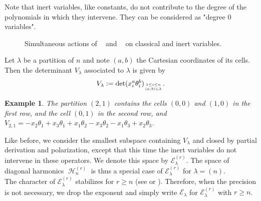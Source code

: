 \documentclass[letter,12pt]{article}
\newcommand{\Elambda}[1]{\mathcal{E}_{#1}}
\newcommand{\Elambdar}[2]{\mathcal{E}_{#1}^{(#2)}}
\DeclareMathOperator{\Sn}{\mathbb{S}_n}
\DeclareMathOperator{\GLr}{GL_r}
\DeclareMathOperator{\harmonics}{\mathcal{H}}
\newtheorem{example}{Example}
\begin{document}
	Note that inert variables, like constants, do not contribute to the degree of the polynomials in which they intervene. They can be considered as "degree 0 variables".  
	
	\begin{figure}[H]
		\centering
		\caption{Simultaneous actions of $\GLr$ and $\Sn$ on classical and inert variables.}
	\end{figure}
	
	Let $\lambda$ be a partition of $n$ and note $(a,b)$ the Cartesian coordinates of its cells. Then the determinant $V_{\lambda}$ associated to $\lambda$ is given by $$V_{\lambda} := \det (x_i^a \theta_i^b)_{1 \leq i \leq n \atop (a,b) \in \lambda} .$$
	
	\begin{example}
		The partition $(2,1)$ contains the cells $(0,0)$ and $(1,0)$ in the first row, and the cell $(0,1)$ in the second row, and $V_{2,1} = -x_2\theta_1 + x_3\theta_1 + x_1\theta_2 - x_3\theta_2 - x_1\theta_3 + x_2\theta_3$. 
	\end{example}
	
	
	Like before, we consider the smallest subspace containing $V_{\lambda}$ and closed by partial derivation and polarization, except that this time the inert variables do not intervene in these operators. We denote this space by $\Elambdar{\lambda}{r}$. The space of diagonal harmonics $\harmonics_n^{(r)}$ is thus a special case of $\Elambdar{\lambda}{r}$ for $\lambda = (n)$. \\
	
	The character of $\Elambdar{\lambda}{r}$ stabilizes for $r \geq n$ (see \cite{Bergeron2013} or \cite{Bergeron2009}). Therefore, when the precision is not necessary, we drop the exponent and simply write $\Elambda{\lambda}$ for $\Elambdar{\lambda}{r}$ with $r \geq n$. 
	
\end{document}
